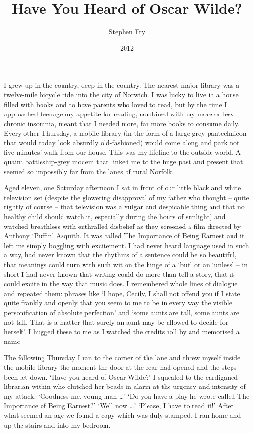 \documentclass[10pt,a4paper]{article}
\begin{document}
\title{Have You Heard of Oscar Wilde?}
\date{2012}
\author{Stephen Fry}
\maketitle
    
\pagestyle{empty}
\thispagestyle{empty}
\linenumbers
I grew up in the country, deep in the country. The nearest major library was a twelve-mile bicycle ride into the city of Norwich. I was lucky to live in a house filled with books and to have parents who loved to read, but by the time I approached teenage my appetite for reading, combined with my more or less chronic insomnia, meant that I needed more, far more books to consume daily. Every other Thursday, a mobile library (in the form of a large grey pantechnicon that would today look absurdly old-fashioned) would come along and park not five minutes’ walk from our house. This was my lifeline to the outside world. A quaint battleship-grey modem that linked me to the huge past and present that seemed so impossibly far from the lanes of rural Norfolk.

Aged eleven, one Saturday afternoon I sat in front of our little black and white television set (despite the glowering disapproval of my father who thought – quite rightly of course – that television was a vulgar and despicable thing and that no healthy child should watch it, especially during the hours of sunlight) and watched breathless with enthralled disbelief as they screened a film directed by Anthony ‘Puffin’ Asquith. It was called The Importance of Being Earnest and it left me simply boggling with excitement. I had never heard language used in such a way, had never known that the rhythms of a sentence could be so beautiful, that meanings could turn with such wit on the hinge of a ‘but’ or an ‘unless’ – in short I had never known that writing could do more than tell a story, that it could excite in the way that music does. I remembered whole lines of dialogue and repeated them: phrases like ‘I hope, Cecily, I shall not offend you if I state quite frankly and openly that you seem to me to be in every way the visible personification of absolute perfection’ and ‘some aunts are tall, some aunts are not tall. That is a matter that surely an aunt may be allowed to decide for herself’. I hugged these to me as I watched the credits roll by and memorised a name.

The following Thursday I ran to the corner of the lane and threw myself inside the mobile library the moment the door at the rear had opened and the steps been let down. ‘Have you heard of Oscar Wilde?’ I squealed to the cardiganed librarian within who clutched her beads in alarm at the urgency and intensity of my attack. ‘Goodness me, young man …’ ‘Do you have a play he wrote called The Importance of Being Earnest?’ ‘Well now …’ ‘Please, I have to read it!’ After what seemed an age we found a copy which was duly stamped. I ran home and up the stairs and into my bedroom.
\end{document}
